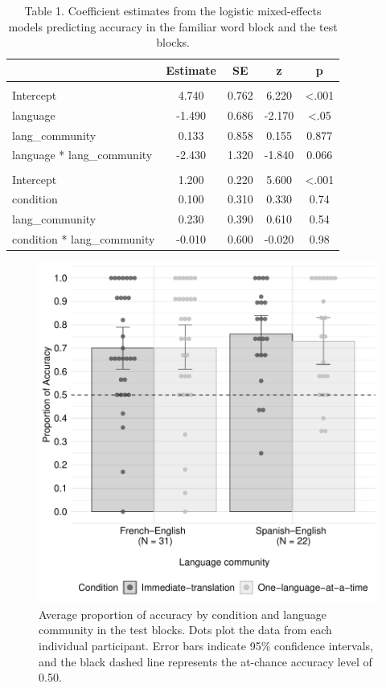 \documentclass[
  man,floatsintext]{apa7}
\begin{document}
\begin{table}

\caption{\label{tab:unnamed-chunk-8}Table 1. Coefficient estimates from the logistic mixed-effects models predicting accuracy in the familiar word block and the test blocks.}
\centering
\fontsize{12}{14}\selectfont
\begin{tabular}[t]{lcccc}
\toprule
  & Estimate & SE & z & p\\
\midrule
\addlinespace[0.3em]
\multicolumn{5}{l}{\textbf{Familiar word block}}\\
\hspace{1em}Intercept & 4.740 & 0.762 & 6.220 & <.001\\
\hspace{1em}language & -1.490 & 0.686 & -2.170 & <.05\\
\hspace{1em}lang\_community & 0.133 & 0.858 & 0.155 & 0.877\\
\hspace{1em}language * lang\_community & -2.430 & 1.320 & -1.840 & 0.066\\
\addlinespace[0.3em]
\multicolumn{5}{l}{\textbf{Test blocks}}\\
\hspace{1em}Intercept & 1.200 & 0.220 & 5.600 & <.001\\
\hspace{1em}condition & 0.100 & 0.310 & 0.330 & 0.74\\
\hspace{1em}lang\_community & 0.230 & 0.390 & 0.610 & 0.54\\
\hspace{1em}condition * lang\_community & -0.010 & 0.600 & -0.020 & 0.98\\
\bottomrule
\end{tabular}
\end{table}

\begin{figure}

{\centering \includegraphics[width=0.6\linewidth]{TabletSwitch_paper_files/figure-latex/Figure3-1} 

}

\caption{Average proportion of accuracy by condition and language community in the test blocks. Dots plot the data from each individual participant. Error bars indicate 95\% confidence intervals, and the black dashed line represents the at-chance accuracy level of 0.50.}\label{fig:Figure3}
\end{figure}
\end{document}
